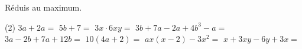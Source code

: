 %
%
Réduis au maximum.
  \begin{tasks}(2)
    \task $3a+2a=$
    \task $5b+7=$
    \task $3x \cdot 6xy=$
    \task $3b+7a-2a+4b^3-a=$
    \task $3a-2b+7a+12b=$
    \task $10\left(4a+2\right)=$
    \task $ax\left(x-2\right) -3x^2=$
    \task $x+3xy-6y+3x=$
  \end{tasks}
